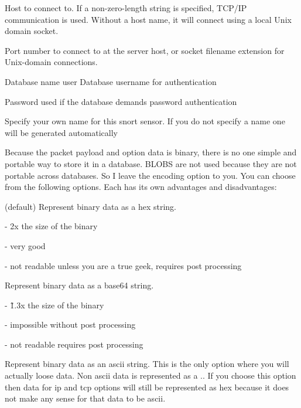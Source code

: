 \documentclass[english]{report}
\begin{document}
\begin{description}{}
\item [host]Host to connect to. If a non-zero-length string is specified, TCP/IP communication is used. Without a host name, it will connect using a local Unix domain socket.
\item [port]Port number to connect to at the server host, or socket filename extension for Unix-domain connections. 
\item [dbname]Database name user Database username for authentication
\item [password]Password used if the database demands password authentication
\item [sensor\_name]Specify your own name for this snort sensor. If you do not specify a name one will be generated automatically
\item [encoding] Because the packet payload and option data is binary, there is no one simple and portable way to store it in a database. BLOBS are not used because they are not portable across databases. So I leave the encoding option to you. You can choose from the following options. Each has its own advantages and disadvantages:

   \begin{description}{}
       \item [hex](default) Represent binary data as a hex string. 

       \begin{description}{}
             \item [storage~requirements]- 2x the size of the binary
             \item [searchability]- very good 
             \item [human~readability]- not readable unless you are a true geek, requires post processing
       \end{description}
       \item [base64]Represent binary data as a base64 string. 

      \begin{description}{}
            \item [storage~requirements]- \~1.3x the size of the binary 
            \item [searchability]- impossible without post processing 
            \item [human~readability]- not readable requires post processing
      \end{description}

      \item [ascii]Represent binary data as an ascii string. This is
      the only option where you will actually loose data. Non ascii
      data is represented as a .. If you choose this option then data
      for ip and tcp options will still be represented as hex because
      it does not make any sense for that data to be ascii.


\end{description}
\end{description}
\end{document}
